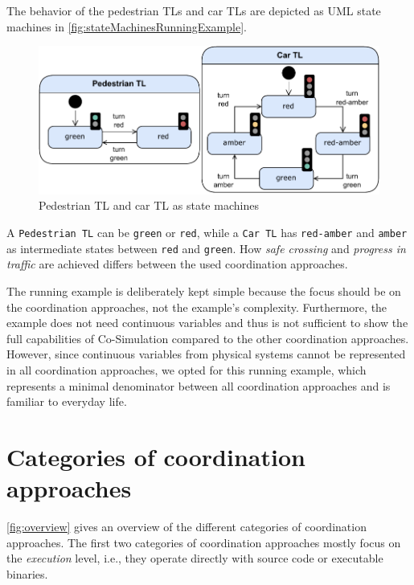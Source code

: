 \documentclass[runningheads]{llncs}
\begin{document}
The behavior of the pedestrian TLs and car TLs are depicted as UML state machines \cite{objectmanagementgroupUnifiedModelingLanguage2017} in \autoref{fig:stateMachinesRunningExample}.

\begin{figure}[ht]
	\centering
	\includegraphics[width=1\textwidth]{images/running_example_models}
	\caption{Pedestrian TL and car TL as state machines}
	\label{fig:stateMachinesRunningExample}
\end{figure}

A \texttt{Pedestrian TL} can be \texttt{green} or \texttt{red}, while a \texttt{Car TL} has \texttt{red-amber} and \texttt{amber} as intermediate states between \texttt{red} and \texttt{green}.
How \textit{safe crossing} and \textit{progress in traffic} are achieved differs between the used coordination approaches.

The running example is deliberately kept simple because the focus should be on the coordination approaches, not the example's complexity.
Furthermore, the example does not need continuous variables and thus is not sufficient to show the full capabilities of Co-Simulation compared to the other coordination approaches.
However, since continuous variables from physical systems cannot be represented in all coordination approaches, we opted for this running example, which represents a minimal denominator between all coordination approaches and is familiar to everyday life.

\section{Categories of coordination approaches} \label{sec:approaches}

\autoref{fig:overview} gives an overview of the different categories of coordination approaches.
The first two categories of coordination approaches mostly focus on the \textit{execution} level, i.e., they operate directly with source code or executable binaries.
\end{document}
